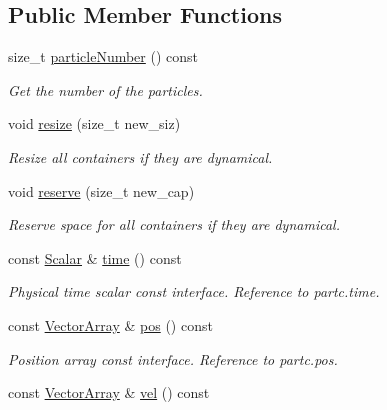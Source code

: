 \subsection*{Public Member Functions}
\begin{DoxyCompactItemize}
\item 
size\+\_\+t \mbox{\hyperlink{class_space_h_1_1_particle_system_aebcc8ea132ff3e1c97713328fa8b0d4a}{particle\+Number}} () const
\begin{DoxyCompactList}\small\item\em Get the number of the particles. \end{DoxyCompactList}\item 
void \mbox{\hyperlink{class_space_h_1_1_particle_system_af485828ec5712726054b377e9c135d39}{resize}} (size\+\_\+t new\+\_\+siz)
\begin{DoxyCompactList}\small\item\em Resize all containers if they are dynamical. \end{DoxyCompactList}\item 
void \mbox{\hyperlink{class_space_h_1_1_particle_system_a8c62e209b283261d3e616ff23eddd748}{reserve}} (size\+\_\+t new\+\_\+cap)
\begin{DoxyCompactList}\small\item\em Reserve space for all containers if they are dynamical. \end{DoxyCompactList}\item 
const \mbox{\hyperlink{class_space_h_1_1_particle_system_a522770dcfaf8b29aed35ea9348185a34}{Scalar}} \& \mbox{\hyperlink{class_space_h_1_1_particle_system_a3c4c4ef7509d5c19d565ffad4bf5286a}{time}} () const
\begin{DoxyCompactList}\small\item\em Physical time scalar const interface. Reference to partc.\+time. \end{DoxyCompactList}\item 
const \mbox{\hyperlink{class_space_h_1_1_particle_system_acf48c66c8d42b85cd3a77911bb7da9ce}{Vector\+Array}} \& \mbox{\hyperlink{class_space_h_1_1_particle_system_a6106365f497255a761789a37cd3f6ea6}{pos}} () const
\begin{DoxyCompactList}\small\item\em Position array const interface. Reference to partc.\+pos. \end{DoxyCompactList}\item 
const \mbox{\hyperlink{class_space_h_1_1_particle_system_acf48c66c8d42b85cd3a77911bb7da9ce}{Vector\+Array}} \& \mbox{\hyperlink{class_space_h_1_1_particle_system_a51c2aae4b2dd9d5aca3c15eb9116ff2d}{vel}} () const

\end{DoxyCompactItemize}
